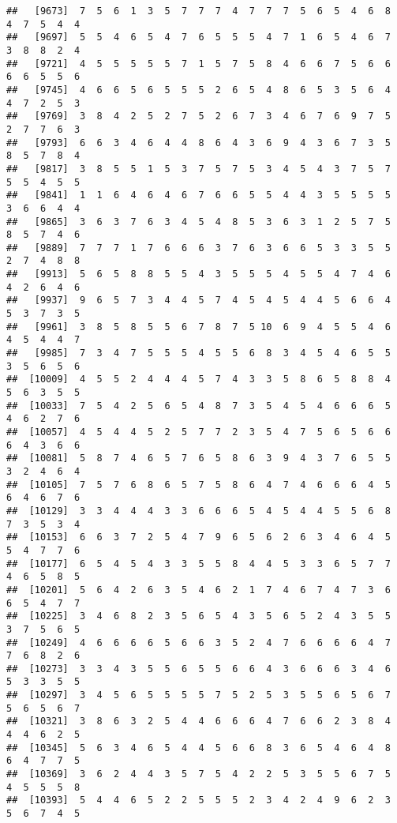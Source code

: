 \documentclass[
]{book}
\begin{document}
\begin{verbatim}
##   [9673]  7  5  6  1  3  5  7  7  7  4  7  7  7  5  6  5  4  6  8  4  7  5  4  4
##   [9697]  5  5  4  6  5  4  7  6  5  5  5  4  7  1  6  5  4  6  7  3  8  8  2  4
##   [9721]  4  5  5  5  5  5  7  1  5  7  5  8  4  6  6  7  5  6  6  6  6  5  5  6
##   [9745]  4  6  6  5  6  5  5  5  2  6  5  4  8  6  5  3  5  6  4  4  7  2  5  3
##   [9769]  3  8  4  2  5  2  7  5  2  6  7  3  4  6  7  6  9  7  5  2  7  7  6  3
##   [9793]  6  6  3  4  6  4  4  8  6  4  3  6  9  4  3  6  7  3  5  8  5  7  8  4
##   [9817]  3  8  5  5  1  5  3  7  5  7  5  3  4  5  4  3  7  5  7  5  5  4  5  5
##   [9841]  1  1  6  4  6  4  6  7  6  6  5  5  4  4  3  5  5  5  5  3  6  6  4  4
##   [9865]  3  6  3  7  6  3  4  5  4  8  5  3  6  3  1  2  5  7  5  8  5  7  4  6
##   [9889]  7  7  7  1  7  6  6  6  3  7  6  3  6  6  5  3  3  5  5  2  7  4  8  8
##   [9913]  5  6  5  8  8  5  5  4  3  5  5  5  4  5  5  4  7  4  6  4  2  6  4  6
##   [9937]  9  6  5  7  3  4  4  5  7  4  5  4  5  4  4  5  6  6  4  5  3  7  3  5
##   [9961]  3  8  5  8  5  5  6  7  8  7  5 10  6  9  4  5  5  4  6  4  5  4  4  7
##   [9985]  7  3  4  7  5  5  5  4  5  5  6  8  3  4  5  4  6  5  5  3  5  6  5  6
##  [10009]  4  5  5  2  4  4  4  5  7  4  3  3  5  8  6  5  8  8  4  5  6  3  5  5
##  [10033]  7  5  4  2  5  6  5  4  8  7  3  5  4  5  4  6  6  6  5  4  6  2  7  6
##  [10057]  4  5  4  4  5  2  5  7  7  2  3  5  4  7  5  6  5  6  6  6  4  3  6  6
##  [10081]  5  8  7  4  6  5  7  6  5  8  6  3  9  4  3  7  6  5  5  3  2  4  6  4
##  [10105]  7  5  7  6  8  6  5  7  5  8  6  4  7  4  6  6  6  4  5  6  4  6  7  6
##  [10129]  3  3  4  4  4  3  3  6  6  6  5  4  5  4  4  5  5  6  8  7  3  5  3  4
##  [10153]  6  6  3  7  2  5  4  7  9  6  5  6  2  6  3  4  6  4  5  5  4  7  7  6
##  [10177]  6  5  4  5  4  3  3  5  5  8  4  4  5  3  3  6  5  7  7  4  6  5  8  5
##  [10201]  5  6  4  2  6  3  5  4  6  2  1  7  4  6  7  4  7  3  6  6  5  4  7  7
##  [10225]  3  4  6  8  2  3  5  6  5  4  3  5  6  5  2  4  3  5  5  3  7  5  6  5
##  [10249]  4  6  6  6  6  5  6  6  3  5  2  4  7  6  6  6  6  4  7  7  6  8  2  6
##  [10273]  3  3  4  3  5  5  6  5  5  6  6  4  3  6  6  6  3  4  6  5  3  3  5  5
##  [10297]  3  4  5  6  5  5  5  5  7  5  2  5  3  5  5  6  5  6  7  5  6  5  6  7
##  [10321]  3  8  6  3  2  5  4  4  6  6  6  4  7  6  6  2  3  8  4  4  4  6  2  5
##  [10345]  5  6  3  4  6  5  4  4  5  6  6  8  3  6  5  4  6  4  8  6  4  7  7  5
##  [10369]  3  6  2  4  4  3  5  7  5  4  2  2  5  3  5  5  6  7  5  4  5  5  5  8
##  [10393]  5  4  4  6  5  2  2  5  5  5  2  3  4  2  4  9  6  2  3  5  6  7  4  5

\end{verbatim}
\end{document}
